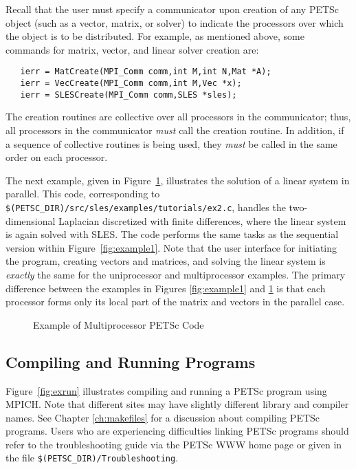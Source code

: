 Recall that the user must specify a communicator upon creation of any
PETSc object (such as a vector, matrix, or solver) to indicate the
processors over which the object is to be distributed.  For example,
as mentioned above, some commands for matrix, vector, and linear solver
creation are:
\begin{verbatim}
   ierr = MatCreate(MPI_Comm comm,int M,int N,Mat *A);
   ierr = VecCreate(MPI_Comm comm,int M,Vec *x);
   ierr = SLESCreate(MPI_Comm comm,SLES *sles); 
\end{verbatim}
The creation routines are collective over all processors in the
communicator; thus, all processors in the communicator {\em must}
call the creation routine.  In addition, if a sequence of
collective routines is being used, they {\em must} be called
in the same order on each processor.

The next example, given in Figure~\ref{fig:example2}, illustrates the
solution of a linear system in parallel.  This code, corresponding to
{\tt \$(PETSC\_DIR)/src/sles/examples/tutorials/ex2.c}, handles the
two-dimensional Laplacian discretized with finite differences, where
the linear system is again solved with SLES.  The code performs the
same tasks as the sequential version within Figure~\ref{fig:example1}.
Note that the user interface for initiating the program, creating
vectors and matrices, and solving the linear system is {\em exactly}
the same for the uniprocessor and multiprocessor examples.  The
primary difference between the examples in Figures \ref{fig:example1}
and \ref{fig:example2} is that each processor forms only its local
part of the matrix and vectors in the parallel case.

\begin{figure}[H]
{\footnotesize
{}
}
\nobreak
\caption{Example of Multiprocessor PETSc Code}
\label{fig:example2}
\end{figure}

\subsection*{Compiling and Running Programs}

Figure~\ref{fig:exrun} illustrates compiling and running a PETSc program
using MPICH.  Note that different sites may have slightly different
library and compiler names.  See Chapter \ref{ch:makefiles}
for a discussion about compiling PETSc programs.
Users who are experiencing difficulties linking PETSc programs should 
refer to the troubleshooting guide via the PETSc WWW home page or
given in the file {\tt \$(PETSC\_DIR)/Troubleshooting}.

